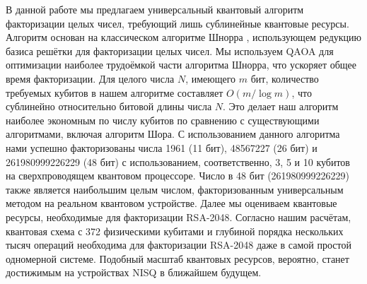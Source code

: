 В данной работе мы предлагаем универсальный квантовый алгоритм факторизации
целых чисел, требующий лишь сублинейные квантовые ресурсы. Алгоритм основан на
классическом алгоритме Шнорра \cite{cite_29, cite_30}, использующем редукцию
базиса решётки для факторизации целых чисел. Мы используем QAOA для оптимизации
наиболее трудоёмкой части алгоритма Шнорра, что ускоряет общее время
факторизации. Для целого числа $N$, имеющего $m$ бит, количество требуемых
кубитов в нашем алгоритме составляет $O(m / \log m)$, что сублинейно
относительно битовой длины числа $N$. Это делает наш алгоритм наиболее
экономным по числу кубитов по сравнению с существующими алгоритмами, включая
алгоритм Шора. С использованием данного алгоритма нами успешно факторизованы
числа 1961 (11 бит), 48567227 (26 бит) и 261980999226229 (48 бит) с
использованием, соответственно, 3, 5 и 10 кубитов на сверхпроводящем квантовом
процессоре. Число в 48 бит (261980999226229) также является наибольшим целым
числом, факторизованным универсальным методом на реальном квантовом устройстве.
Далее мы оцениваем квантовые ресурсы, необходимые для факторизации RSA-2048.
Согласно нашим расчётам, квантовая схема с 372 физическими кубитами и глубиной
порядка нескольких тысяч операций необходима для факторизации RSA-2048 даже в
самой простой одномерной системе. Подобный масштаб квантовых ресурсов,
вероятно, станет достижимым на устройствах NISQ в ближайшем будущем.

